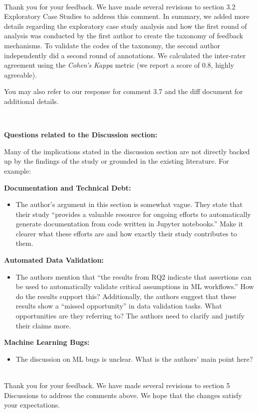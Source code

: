 \documentclass[11pt,fleqn]{article}
\newcommand{\eline}{\vspace*{.75\baselineskip}}
\newcommand{\Referee}[1]{\eline \noindent {\bf Reviewer comment #1:} \\}
\newcommand{\Us}{\eline \noindent {\bf Response:}\\}
\newenvironment{revcomment}[1][]
{\Referee{#1}\begin{rcomment}}
{\end{rcomment}}
\begin{document}
\Us Thank you for your feedback. We have made several revisions to section 3.2 Exploratory Case Studies to address this comment. In summary, we added more details regarding the exploratory case study analysis and how the first round of analysis was conducted by the first author to create the taxonomy of feedback mechanisms. To validate the codes of the taxonomy, the second author independently did a second round of annotations. We calculated the inter-rater agreement using the \emph{Cohen's Kappa} metric (we report a score of 0.8, highly agreeable).

You may also refer to our response for comment 3.7 and the diff document for additional details.

\begin{revcomment}[3.11]
  \textbf{Questions related to the Discussion section:}

  Many of the implications stated in the discussion section are not directly backed up by the findings of the study or grounded in the existing literature. For example:

  \textbf{Documentation and Technical Debt:}

  \begin{itemize}
  \item The author's argument in this section is somewhat vague. They state that their study ``provides a valuable resource for ongoing efforts to automatically generate documentation from code written in Jupyter notebooks.'' Make it clearer what these efforts are and how exactly their study contributes to them.
  \end{itemize}

  \textbf{Automated Data Validation:}

  \begin{itemize}
  \item The authors mention that ``the results from RQ2 indicate that assertions can be used to automatically validate critical assumptions in ML workflows.'' How do the results support this? Additionally, the authors suggest that these results show a ``missed opportunity'' in data validation tasks. What opportunities are they referring to? The authors need to clarify and justify their claims more.
  \end{itemize}
  \textbf{Machine Learning Bugs:}

  \begin{itemize}
  \item The discussion on ML bugs is unclear. What is the authors' main point here?
  \end{itemize}
\end{revcomment}

\Us Thank you for your feedback. We have made several revisions to section 5 Discussions to address the comments above. We hope that the changes satisfy your expectations.

\todos
\end{document}
